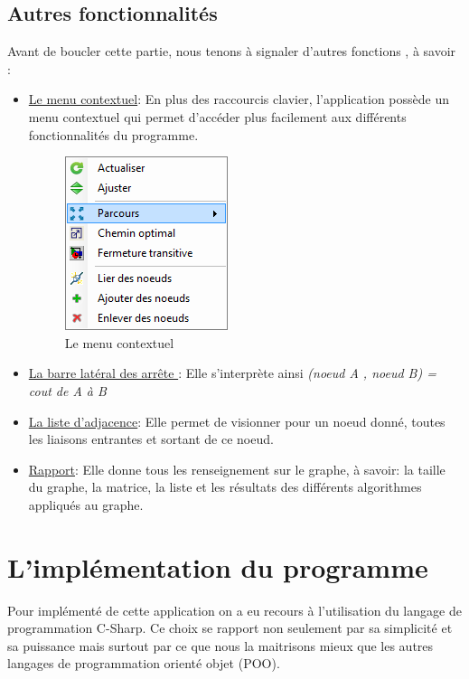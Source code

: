 \documentclass[11pt,twoside,a4paper]{article}
\begin{document}
\subsection{Autres fonctionnalités}
Avant de boucler cette partie, nous tenons à signaler d’autres fonctions , à savoir :
\begin{itemize}
\item \underline{Le menu contextuel}:
	En plus des raccourcis clavier, l'application possède un menu contextuel qui permet d'accéder plus facilement aux différents fonctionnalités du programme.
	\begin{figure}[!h]
	\begin{center}
	\includegraphics{contextuleMenu.png}	
	\caption{Le menu contextuel}
	\end{center}
	\end{figure}
\item \underline{La barre latéral des arrête }: Elle s'interprète ainsi { \it(noeud A , noeud B) = cout de A à B}
\item \underline{La liste d’adjacence}:
	Elle permet de visionner pour un noeud donné, toutes les liaisons entrantes et sortant de ce noeud.
\item \underline{Rapport}:
	Elle donne tous les renseignement sur le graphe, à savoir:  la taille du graphe, la matrice, la liste et les résultats des  différents algorithmes  appliqués au graphe.



 \end{itemize}
\newpage

\section{L’implémentation du programme}

Pour implémenté de cette application on a eu recours à l’utilisation du langage de programmation C-Sharp. Ce choix se rapport non seulement par sa simplicité et sa puissance mais surtout par ce que nous la maitrisons mieux que les autres langages de programmation orienté objet (POO).
\end{document}

